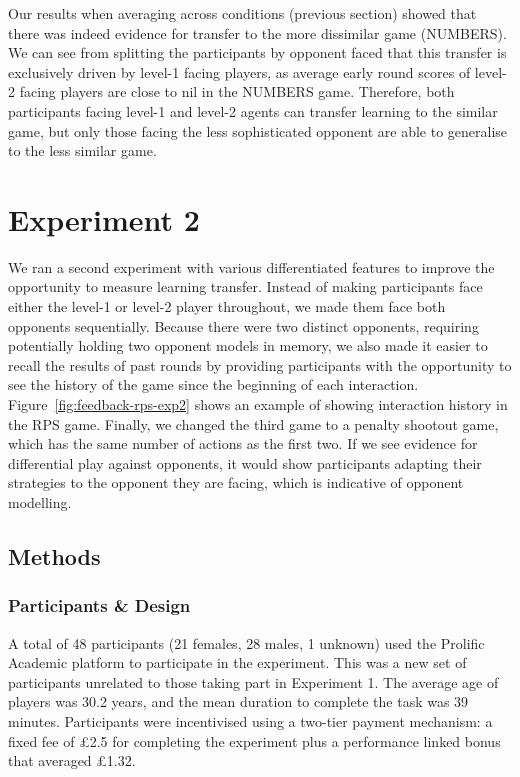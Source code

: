 \documentclass[man,floatsintext]{apa6}
\begin{document}
Our results when averaging across conditions (previous section) showed that there was indeed evidence for transfer to the more dissimilar game (NUMBERS). We can see from splitting the participants by opponent faced that this transfer is exclusively driven by level-1 facing players, as average early round scores of level-2 facing players are close to nil in the NUMBERS game. Therefore, both participants facing level-1 and level-2 agents can transfer learning to the similar game, but only those facing the less sophisticated opponent are able to generalise to the less similar game.

\hypertarget{experiment-2}{%
\section{Experiment 2}\label{experiment-2}}

We ran a second experiment with various differentiated features to improve the opportunity to measure learning transfer. Instead of making participants face either the level-1 or level-2 player throughout, we made them face both opponents sequentially. Because there were two distinct opponents, requiring potentially holding two opponent models in memory, we also made it easier to recall the results of past rounds by providing participants with the opportunity to see the history of the game since the beginning of each interaction. Figure~\ref{fig:feedback-rps-exp2} shows an example of showing interaction history in the RPS game. Finally, we changed the third game to a penalty shootout game, which has the same number of actions as the first two. If we see evidence for differential play against opponents, it would show participants adapting their strategies to the opponent they are facing, which is indicative of opponent modelling.

\hypertarget{methods-1}{%
\subsection{Methods}\label{methods-1}}

\hypertarget{participants-design}{%
\subsubsection{Participants \& Design}\label{participants-design}}

A total of 48 participants (21 females, 28 males, 1 unknown) used the Prolific Academic platform to participate in the experiment. This was a new set of participants unrelated to those taking part in Experiment 1. The average age of players was 30.2 years, and the mean duration to complete the task was 39 minutes. Participants were incentivised using a two-tier payment mechanism: a fixed fee of £2.5 for completing the experiment plus a performance linked bonus that averaged £1.32.
\end{document}
